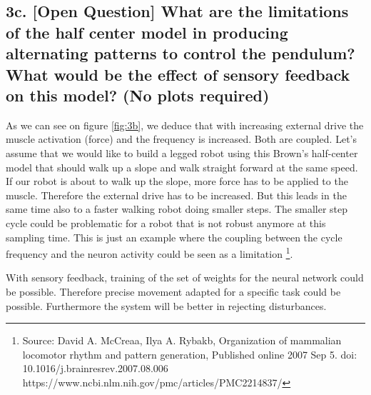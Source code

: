 \documentclass{cmc}
\begin{document}
\subsection*{3c. [Open Question] What are the limitations of the half
  center model in producing alternating patterns to control the
  pendulum? What would be the effect of sensory feedback on this
  model? (No plots required)}
  
  As we can see on figure \ref{fig:3b}, we deduce that with increasing external drive the muscle activation (force) and the frequency is increased. Both are coupled. Let's assume that we would like to build a legged robot using this Brown's half-center model that should walk up a slope and walk straight forward at the same speed. If our robot is about to walk up the slope, more force has to be applied to the muscle. Therefore the external drive has to be increased. But this leads in the same time also to a faster walking robot doing smaller steps. The smaller step cycle could be problematic for a robot that is not robust anymore at this sampling time. This is just an example where the coupling between the cycle frequency and the neuron activity could be seen as a limitation \footnote{Source: David A. McCreaa, Ilya A. Rybakb, Organization of mammalian locomotor rhythm and pattern generation, Published online 2007 Sep 5. doi: 10.1016/j.brainresrev.2007.08.006 https://www.ncbi.nlm.nih.gov/pmc/articles/PMC2214837/}.
  
  With sensory feedback, training of the set of weights for the neural network could be possible. Therefore precise movement adapted for a specific task could be possible. Furthermore the system will be better in rejecting disturbances.
  
\label{sec:4d}
\end{document}
